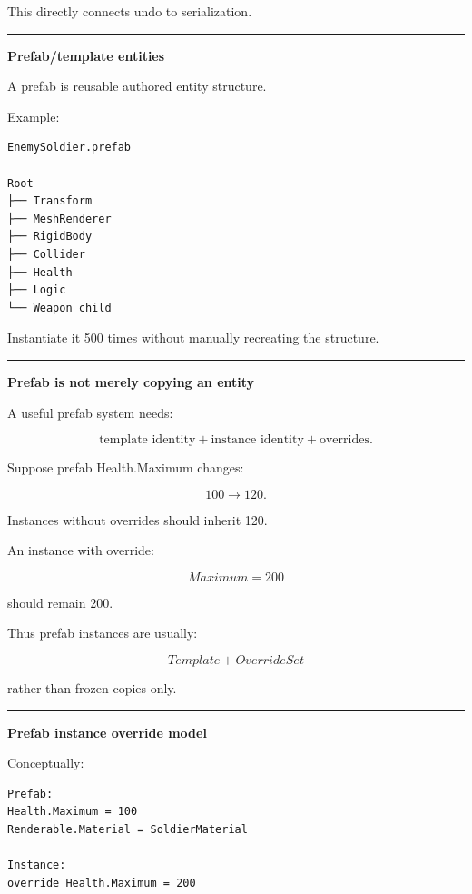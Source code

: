 This directly connects undo to serialization.

\begin{center}\rule{0.5\linewidth}{0.5pt}\end{center}

\textbf{Prefab/template entities}

A prefab is reusable authored entity structure.

Example:

\begin{verbatim}
EnemySoldier.prefab

Root
├── Transform
├── MeshRenderer
├── RigidBody
├── Collider
├── Health
├── Logic
└── Weapon child
\end{verbatim}

Instantiate it 500 times without manually recreating the structure.

\begin{center}\rule{0.5\linewidth}{0.5pt}\end{center}

\textbf{Prefab is not merely copying an entity}

A useful prefab system needs:

\[
\text{template identity}
+
\text{instance identity}
+
\text{overrides}.
\]

Suppose prefab Health.Maximum changes:

\[
100\rightarrow120.
\]

Instances without overrides should inherit 120.

An instance with override:

\[
Maximum=200
\]

should remain 200.

Thus prefab instances are usually:

\[
\boxed{
Template
+
OverrideSet
}
\]

rather than frozen copies only.

\begin{center}\rule{0.5\linewidth}{0.5pt}\end{center}

\textbf{Prefab instance override model}

Conceptually:

\begin{verbatim}
Prefab:
Health.Maximum = 100
Renderable.Material = SoldierMaterial

Instance:
override Health.Maximum = 200
\end{verbatim}

